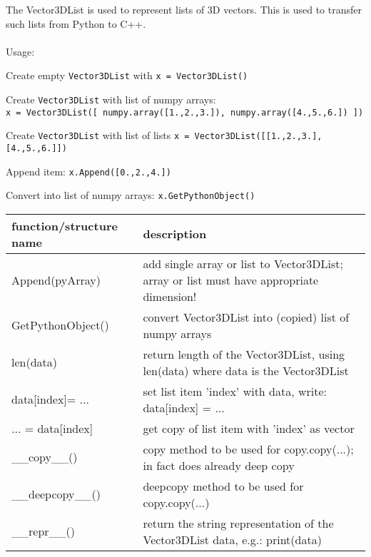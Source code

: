 The Vector3DList is used to represent lists of 3D vectors. This is used to transfer such lists from Python to C++. \\ \\ Usage: \bi
  \item Create empty \texttt{Vector3DList} with \texttt{x = Vector3DList()} 
  \item Create \texttt{Vector3DList} with list of numpy arrays:\\\texttt{x = Vector3DList([ numpy.array([1.,2.,3.]), numpy.array([4.,5.,6.]) ])}
  \item Create \texttt{Vector3DList} with list of lists \texttt{x = Vector3DList([[1.,2.,3.], [4.,5.,6.]])}
  \item Append item: \texttt{x.Append([0.,2.,4.])}
  \item Convert into list of numpy arrays: \texttt{x.GetPythonObject()}
\ei


\begin{center}
\footnotesize
\begin{longtable}{| p{8cm} | p{8cm} |} 
\hline
{\bf function/structure name} & {\bf description}\\ \hline
  Append(pyArray) & add single array or list to Vector3DList; array or list must have appropriate dimension!\\ \hline 
  GetPythonObject() & convert Vector3DList into (copied) list of numpy arrays\\ \hline 
  len(data) & return length of the Vector3DList, using len(data) where data is the Vector3DList\\ \hline 
  data[index]= ... & set list item 'index' with data, write: data[index] = ...\\ \hline 
  ... = data[index] & get copy of list item with 'index' as vector\\ \hline 
  \_\_copy\_\_() & copy method to be used for copy.copy(...); in fact does already deep copy\\ \hline 
  \_\_deepcopy\_\_() & deepcopy method to be used for copy.copy(...)\\ \hline 
  \_\_repr\_\_() & return the string representation of the Vector3DList data, e.g.: print(data)\\ \hline 
\end{longtable}
\end{center}

